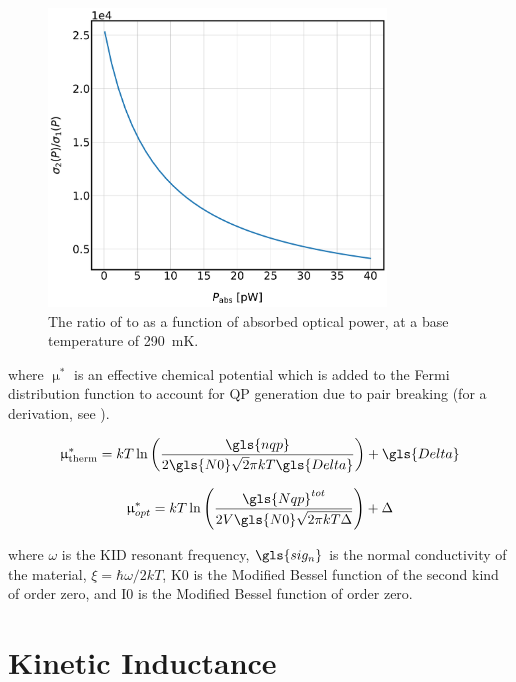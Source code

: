 \begin{figure}[!htbp]
\centering
\includegraphics[width=0.8\textwidth]{figures/kid_model/sig_ratio_P}
\caption[~The ratio of  to  as a function of absorbed optical power at a base temperature of 290~mK.]{The ratio of  to  as a function of absorbed optical power, at a base temperature of 290~mK.}
\label{fig:sig_ratio_P}
\end{figure}

where $\upmu^{*}$ is an effective chemical potential which is added to the Fermi distribution function to account for QP generation due to pair breaking (for a derivation, see \citet{PhysRevLett.28.1559,gao2008physics}).

\begin{equation}
  \upmu^{*}_{\mathrm{therm}} = kT\ln\left( \frac{\gls{nqp}}{2\gls{N0}\sqrt 2\pi kT\gls{Delta}} \right) + \gls{Delta}
\end{equation}

\begin{equation}
  \upmu^{*}_{opt} = kT\ln \left( \frac{\gls{Nqp}^{tot}}{2V\gls{N0}\sqrt{2\pi kT\Delta}} \right) + \Delta
\end{equation}

where $\omega$ is the KID resonant frequency, $\gls{sig_n}$ is the normal conductivity of the material, $\xi = \hbar \omega/2kT$, \gls{K0} is the Modified Bessel function of the second kind of order zero, and \gls{I0} is the Modified Bessel function of order zero.

\section{Kinetic Inductance} \label{sec:kinetic_inductance}

